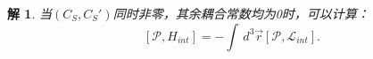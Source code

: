 \documentclass[UTF8,10pt,a4paper]{article}
\theoremstyle{Problem}%
\theoremstyle{Solution}%
\newtheorem*{sol}{解}%
\begin{document}
\begin{sol}
当$(C_S,C_S')$同时非零，其余耦合常数均为0时，可以计算：
\[
    [\mathcal{P},H_{int}] = -\int \,d^3\vec{r} [\mathcal{P}, \mathcal{L}_{int}].
\]


\end{sol}
\end{document}
